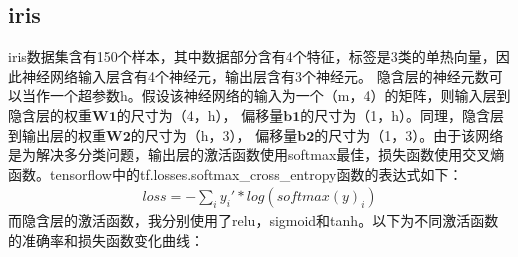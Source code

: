 \documentclass{article}
\begin{document}
\subsection{iris}
iris数据集含有150个样本，其中数据部分含有4个特征，标签是3类的单热向量，因此神经网络输入层含有4个神经元，输出层含有3个神经元。
隐含层的神经元数可以当作一个超参数h。假设该神经网络的输入为一个（m，4）的矩阵，则输入层到隐含层的权重$\mathbf{W1}$的尺寸为（4，h），
偏移量$\mathbf{b1}$的尺寸为（1，h）。同理，隐含层到输出层的权重$\mathbf{W2}$的尺寸为（h，3），
偏移量$\mathbf{b2}$的尺寸为（1，3）。由于该网络是为解决多分类问题，输出层的激活函数使用softmax最佳，损失函数使用交叉熵函数。tensorflow中的tf.losses.softmax\_cross\_entropy函数的表达式如下：
\begin{eqnarray*}
    loss = - \sum_i y_i'*log(softmax(y)_i)
\end{eqnarray*}
\newpage
而隐含层的激活函数，我分别使用了relu，sigmoid和tanh。以下为不同激活函数的准确率和损失函数变化曲线：
\end{document}
